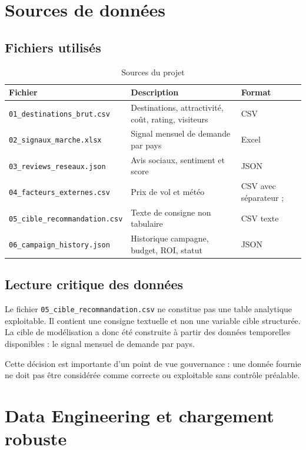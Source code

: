 \documentclass[11pt,a4paper]{report}
\begin{document}
\chapter{Sources de données}

\section{Fichiers utilisés}

\begin{table}[H]
\centering
\caption{Sources du projet}
\begin{tabularx}{\textwidth}{lXl}
\toprule
\textbf{Fichier} & \textbf{Description} & \textbf{Format} \\
\midrule
\texttt{01\_destinations\_brut.csv} & Destinations, attractivité, coût, rating, visiteurs & CSV \\
\texttt{02\_signaux\_marche.xlsx} & Signal mensuel de demande par pays & Excel \\
\texttt{03\_reviews\_reseaux.json} & Avis sociaux, sentiment et score & JSON \\
\texttt{04\_facteurs\_externes.csv} & Prix de vol et météo & CSV avec séparateur ; \\
\texttt{05\_cible\_recommandation.csv} & Texte de consigne non tabulaire & CSV texte \\
\texttt{06\_campaign\_history.json} & Historique campagne, budget, ROI, statut & JSON \\
\bottomrule
\end{tabularx}
\end{table}

\section{Lecture critique des données}

Le fichier \texttt{05\_cible\_recommandation.csv} ne constitue pas une table analytique exploitable. Il contient une consigne textuelle et non une variable cible structurée. La cible de modélisation a donc été construite à partir des données temporelles disponibles : le signal mensuel de demande par pays.

Cette décision est importante d'un point de vue gouvernance : une donnée fournie ne doit pas être considérée comme correcte ou exploitable sans contrôle préalable.

\chapter{Data Engineering et chargement robuste}
\end{document}
